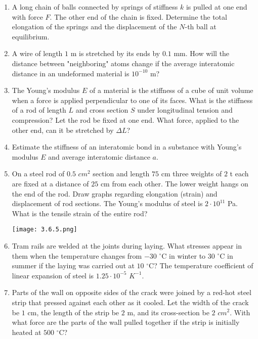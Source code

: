 \documentclass{article}
\begin{document}
\begin{enumerate}[label=3.6.\arabic*]

\item A long chain of balls connected by springs of stiffness $k$ is pulled at one end with force $F$. The other end of the chain is fixed. Determine the total elongation of the springs and the displacement of the $N$-th ball at equilibrium.

\item A wire of length $1$ m is stretched by its ends by $0.1$ mm. How will the distance between "neighboring" atoms change if the average interatomic distance in an undeformed material is $10^{-10}$ m?

\item The Young's modulus $E$ of a material is the stiffness of a cube of unit volume when a force is applied perpendicular to one of its faces. What is the stiffness of a rod of length $L$ and cross section $S$ under longitudinal tension and compression? Let the rod be fixed at one end. What force, applied to the other end, can it be stretched by $\Delta L$?

\item Estimate the stiffness of an interatomic bond in a substance with Young's modulus $E$ and average interatomic distance $a$.

\item On a steel rod of $0.5$ $cm^2$ section and length $75$ cm three weights of $2$ t each are fixed at a distance of $25$ cm from each other. The lower weight hangs on the end of the rod. Draw graphs regarding elongation (strain) and displacement of rod sections. The Young's modulus of steel is $2 \cdot 10^{11}$ Pa. What is the tensile strain of the entire rod?

\begin{center}
    \texttt{[image: 3.6.5.png]}
\end{center}

\item Tram rails are welded at the joints during laying. What stresses appear in them when the temperature changes from $-30$ $^\circ$C in winter to $30$ $^\circ$C in summer if the laying was carried out at $10$ $^\circ$C? The temperature coefficient of linear expansion of steel is $1.25 \cdot 10^{-5}$ $K^{-1}$.

\item Parts of the wall on opposite sides of the crack were joined by a red-hot steel strip that pressed against each other as it cooled. Let the width of the crack be $1$ cm, the length of the strip be $2$ m, and its cross-section be $2$ $cm^2$. With what force are the parts of the wall pulled together if the strip is initially heated at $500$ $^\circ$C?


\end{enumerate}
\end{document}
